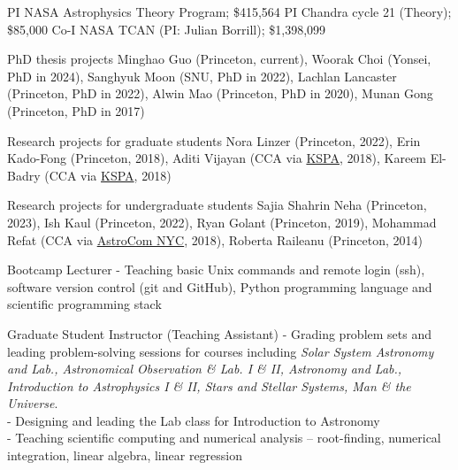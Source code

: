 \documentclass[12pt]{article}
\begin{document}

{PI}
{NASA Astrophysics Theory Program; \$415,564}
{PI}
{Chandra cycle 21 (Theory); \$85,000}
{Co-I}
{NASA TCAN (PI: Julian Borrill); \$1,398,099}



{PhD thesis projects}
{Minghao Guo (Princeton, current), Woorak Choi (Yonsei, PhD in 2024),  Sanghyuk Moon (SNU, PhD in 2022),  Lachlan Lancaster (Princeton, PhD in 2022),  Alwin Mao (Princeton, PhD in 2020),  Munan Gong (Princeton, PhD in 2017)}

{Research projects for graduate students}
{Nora Linzer (Princeton, 2022),  Erin Kado-Fong (Princeton, 2018),  Aditi Vijayan (CCA via \href{https://kspa.soe.ucsc.edu/archives/2018}{KSPA}, 2018),  Kareem El-Badry (CCA via \href{https://kspa.soe.ucsc.edu/archives/2018}{KSPA}, 2018)}

{Research projects for undergraduate students}
{Sajia Shahrin Neha (Princeton, 2023), Ish Kaul (Princeton, 2022),  Ryan Golant (Princeton, 2019),  Mohammad Refat (CCA via \href{http://cunyastro.org/astrocom/}{AstroCom NYC}, 2018),  Roberta Raileanu (Princeton, 2014)}



{Bootcamp Lecturer}
{- Teaching basic Unix commands and remote login (ssh), software version control (git and GitHub), Python programming language and scientific programming stack}

{Graduate Student Instructor (Teaching Assistant)}
{- Grading problem sets and leading problem-solving sessions for courses including \emph{Solar System Astronomy and Lab., Astronomical Observation \& Lab. I \& II, Astronomy and Lab., Introduction to Astrophysics I \& II, Stars and Stellar Systems, Man \& the Universe}. \\ - Designing and leading the Lab class for Introduction to Astronomy\\- Teaching scientific computing and numerical analysis -- root-finding, numerical integration, linear algebra, linear regression}
\end{document}
